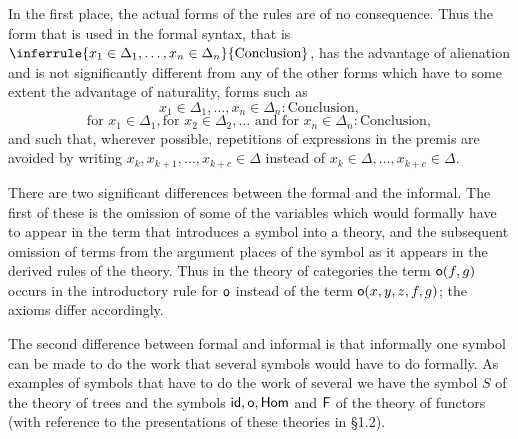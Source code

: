 In the first place, the actual forms of the rules are of no consequence.
%
Thus the form that is used in the formal syntax, that is $\inferrule{x_1\in\Delta_1,\ldots,x_n\in\Delta_n}{\text{Conclusion}}$, has the advantage of alienation and is not significantly different from any of the other forms which have to some extent the advantage of naturality, forms such as
\[x_1\in\Delta_1,\ldots,x_n\in\Delta_n: \text{Conclusion},\]
\[\text{for }x_1\in\Delta_1,\text{for }x_2\in\Delta_2,\ldots \text{ and for }x_n\in\Delta_n: \text{Conclusion},\]
and such that, wherever possible, repetitions of expressions in the premis are avoided by writing $x_k,x_{k+1},\ldots,x_{k+c}\in\Delta$ instead of $x_k\in\Delta,\ldots, x_{k+c}\in\Delta$.


There are two significant differences between the formal and the informal.
%
The first of these is the omission of some of the variables which would formally have to appear in the term that introduces a symbol into a theory, and the subsequent omission of terms from the argument places of the symbol as it appears in the derived rules of the theory.
%
Thus in the theory of categories the term $\mathsf{o}(f,g)$ occurs in the introductory rule for $\mathsf{o}$ instead of the term $\mathsf{o}(x,y,z,f,g)$; the axioms differ accordingly.

The second difference between formal and informal is that informally one symbol can be made to do the work that several symbols would have to do formally.
%
As examples of symbols that have to do the work of several we have the symbol $S$ of the theory of trees and the symbols $\mathsf{id},\mathsf{o},\mathsf{Hom}$ and $\mathsf{F}$ of the theory of functors (with reference to the presentations of these theories in \S 1.2).

